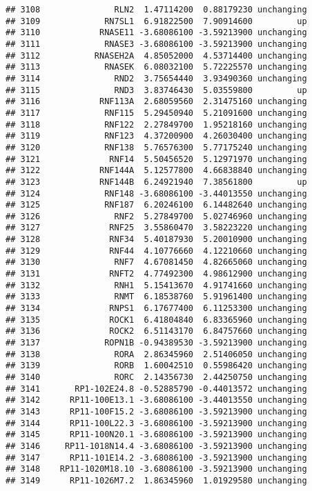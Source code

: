 \documentclass[]{article}
\begin{document}
\begin{verbatim}
## 3108               RLN2  1.47114200  0.88179230 unchanging
## 3109             RN7SL1  6.91822500  7.90914600         up
## 3110            RNASE11 -3.68086100 -3.59213900 unchanging
## 3111             RNASE3 -3.68086100 -3.59213900 unchanging
## 3112           RNASEH2A  4.85052000  4.53714400 unchanging
## 3113             RNASEK  6.08032100  5.72225570 unchanging
## 3114               RND2  3.75654440  3.93490360 unchanging
## 3115               RND3  3.83746430  5.03559800         up
## 3116            RNF113A  2.68059560  2.31475160 unchanging
## 3117             RNF115  5.29450940  5.21091600 unchanging
## 3118             RNF122  2.27849700  1.95218160 unchanging
## 3119             RNF123  4.37200900  4.26030400 unchanging
## 3120             RNF138  5.76576300  5.77175240 unchanging
## 3121              RNF14  5.50456520  5.12971970 unchanging
## 3122            RNF144A  5.12577800  4.66838840 unchanging
## 3123            RNF144B  6.24921940  7.38561800         up
## 3124             RNF148 -3.68086100 -3.44013550 unchanging
## 3125             RNF187  6.20246100  6.14482640 unchanging
## 3126               RNF2  5.27849700  5.02746960 unchanging
## 3127              RNF25  3.55860470  3.58223220 unchanging
## 3128              RNF34  5.40187930  5.20010900 unchanging
## 3129              RNF44  4.10776660  4.12210660 unchanging
## 3130               RNF7  4.67081450  4.82665060 unchanging
## 3131              RNFT2  4.77492300  4.98612900 unchanging
## 3132               RNH1  5.15413670  4.91741660 unchanging
## 3133               RNMT  6.18538760  5.91961400 unchanging
## 3134              RNPS1  6.17677400  6.11253300 unchanging
## 3135              ROCK1  6.41804840  6.83365960 unchanging
## 3136              ROCK2  6.51143170  6.84757660 unchanging
## 3137             ROPN1B -0.94389530 -3.59213900 unchanging
## 3138               RORA  2.86345960  2.51406050 unchanging
## 3139               RORB  1.60042510  0.55986420 unchanging
## 3140               RORC  2.14356730  2.44250750 unchanging
## 3141       RP1-102E24.8 -0.52885790 -0.44013572 unchanging
## 3142      RP11-100E13.1 -3.68086100 -3.44013550 unchanging
## 3143      RP11-100F15.2 -3.68086100 -3.59213900 unchanging
## 3144      RP11-100L22.3 -3.68086100 -3.59213900 unchanging
## 3145      RP11-100N20.1 -3.68086100 -3.59213900 unchanging
## 3146     RP11-1018N14.4 -3.68086100 -3.59213900 unchanging
## 3147      RP11-101E14.2 -3.68086100 -3.59213900 unchanging
## 3148    RP11-1020M18.10 -3.68086100 -3.59213900 unchanging
## 3149      RP11-1026M7.2  1.86345960  1.01929580 unchanging

\end{verbatim}
\end{document}
